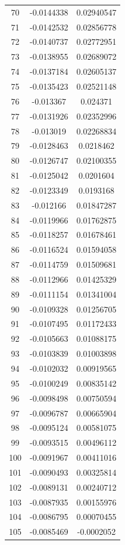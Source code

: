 \documentclass[a4paper, 11pt, oneside]{report}
\begin{document}
{\begin{longtable}{|c|c|c|}
70  & -0.0144338 & 0.02940547 \\
71  & -0.0142532 & 0.02856778 \\
72  & -0.0140737 & 0.02772951 \\
73  & -0.0138955 & 0.02689072 \\
74  & -0.0137184 & 0.02605137 \\
75  & -0.0135423 & 0.02521148 \\
76  & -0.013367  & 0.024371   \\
77  & -0.0131926 & 0.02352996 \\
78  & -0.013019  & 0.02268834 \\
79  & -0.0128463 & 0.0218462  \\
80  & -0.0126747 & 0.02100355 \\
81  & -0.0125042 & 0.0201604  \\
82  & -0.0123349 & 0.0193168  \\
83  & -0.012166  & 0.01847287 \\
84  & -0.0119966 & 0.01762875 \\
85  & -0.0118257 & 0.01678461 \\
86  & -0.0116524 & 0.01594058 \\
87  & -0.0114759 & 0.01509681 \\
88  & -0.0112966 & 0.01425329 \\
89  & -0.0111154 & 0.01341004 \\
90  & -0.0109328 & 0.01256705 \\
91  & -0.0107495 & 0.01172433 \\
92  & -0.0105663 & 0.01088175 \\
93  & -0.0103839 & 0.01003898 \\
94  & -0.0102032 & 0.00919565 \\
95  & -0.0100249 & 0.00835142 \\
96  & -0.0098498 & 0.00750594 \\
97  & -0.0096787 & 0.00665904 \\
98  & -0.0095124 & 0.00581075 \\
99  & -0.0093515 & 0.00496112 \\
100 & -0.0091967 & 0.00411016 \\
101 & -0.0090493 & 0.00325814 \\
102 & -0.0089131 & 0.00240712 \\
103 & -0.0087935 & 0.00155976 \\
104 & -0.0086795 & 0.00070455 \\
105 & -0.0085469 & -0.0002052 \\

\end{longtable}}
\end{document}
